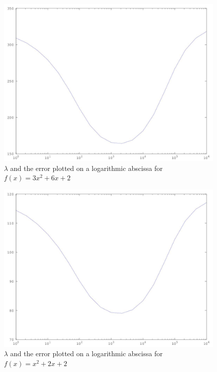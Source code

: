 \documentclass[12pt]{article}
\begin{document}
	\begin{figure}
		\centering
		\includegraphics[scale=0.7]{log}
		\caption{ $\lambda$ and the error plotted on a logarithmic abscissa for $f(x) = 3x^2 + 6x + 2$}
		\label{log_1}
	\end{figure}
	\begin{figure}
		\centering
		\includegraphics[scale=0.7]{log_small_f}
		\caption{ $\lambda$ and the error plotted on a logarithmic abscissa for $f(x) = x^2 + 2x + 2$}
		\label{log_2}
	\end{figure}
	
\end{document}
